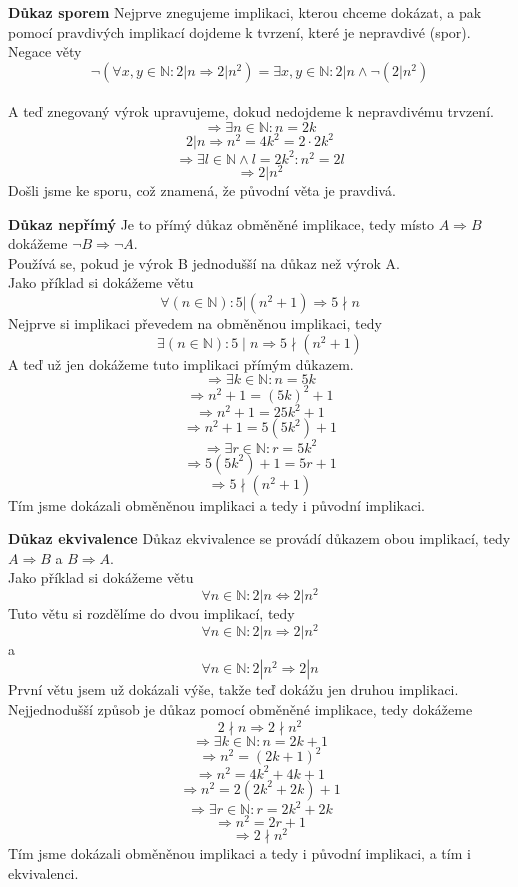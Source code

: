 \documentclass[12pt]{article}
\begin{document}
\textbf{Důkaz sporem}
Nejprve znegujeme implikaci, kterou chceme dokázat, a pak pomocí pravdivých implikací dojdeme k tvrzení, které je nepravdivé (spor).\\
Negace věty \[\neg(\forall x,y \in \mathbb{N}: 2|n \Rightarrow 2|n^2) = \exists x,y \in \mathbb{N}: 2|n \land \neg(2|n^2)\]\\
A teď znegovaný výrok upravujeme, dokud nedojdeme k nepravdivému trvzení.
\[\Rightarrow \exists n \in \mathbb{N}: n = 2k\]
\[2|n \Rightarrow n^2 = 4k^2 = 2\cdot 2k^2\]
\[\Rightarrow \exists l \in \mathbb{N} \land l = 2k^2: n^2 = 2l\]
\[\Rightarrow 2|n^2\]
Došli jsme ke sporu, což znamená, že původní věta je pravdivá.

\textbf{Důkaz nepřímý}
Je to přímý důkaz obměněné implikace, tedy místo $A \Rightarrow B$ dokážeme $\neg B \Rightarrow \neg A$.\\
Používá se, pokud je výrok B jednodušší na důkaz než výrok A.\\
Jako příklad si dokážeme větu \[\forall(n\in \mathbb{N}): 5|(n^2+1) \Rightarrow 5\nmid n\]
Nejprve si implikaci převedem na obměněnou implikaci, tedy \[\exists(n\in \mathbb{N}): 5 \mid n \Rightarrow 5\nmid (n^2+1)\]
A teď už jen dokážeme tuto implikaci přímým důkazem.
\[\Rightarrow \exists k \in \mathbb{N}: n = 5k\]
\[\Rightarrow n^2 + 1 = (5k)^2 + 1\]
\[\Rightarrow n^2 + 1 = 25k^2 + 1\]
\[\Rightarrow n^2 + 1 = 5(5k^2) + 1\]
\[\Rightarrow \exists r \in \mathbb{N}: r = 5k^2\]
\[\Rightarrow 5(5k^2) + 1 = 5r + 1\]
\[\Rightarrow 5 \nmid (n^2 + 1)\]
Tím jsme dokázali obměněnou implikaci a tedy i původní implikaci.

\textbf{Důkaz ekvivalence}
Důkaz ekvivalence se provádí důkazem obou implikací, tedy $A \Rightarrow B$ a $B \Rightarrow A$.\\
Jako příklad si dokážeme větu \[\forall n \in \mathbb{N}: 2|n \Leftrightarrow 2|n^2\]
Tuto větu si rozdělíme do dvou implikací, tedy \[\forall n \in \mathbb{N}: 2|n \Rightarrow 2|n^2\] a \[\forall n \in \mathbb{N}: 2|n^2 \Rightarrow 2|n\]
První větu jsem už dokázali výše, takže teď dokážu jen druhou implikaci. Nejjednodušší způsob je důkaz pomocí obměněné implikace, tedy dokážeme \[2\nmid n \Rightarrow 2\nmid n^2\]
\[\Rightarrow \exists k \in \mathbb{N}: n = 2k + 1\]
\[\Rightarrow n^2 = (2k + 1)^2\]
\[\Rightarrow n^2 = 4k^2 + 4k + 1\]
\[\Rightarrow n^2 = 2(2k^2 + 2k) + 1\]
\[\Rightarrow \exists r \in \mathbb{N}: r = 2k^2 + 2k\]
\[\Rightarrow n^2 = 2r + 1\]
\[\Rightarrow 2 \nmid n^2\]
Tím jsme dokázali obměněnou implikaci a tedy i původní implikaci, a tím i ekvivalenci.
\end{document}
